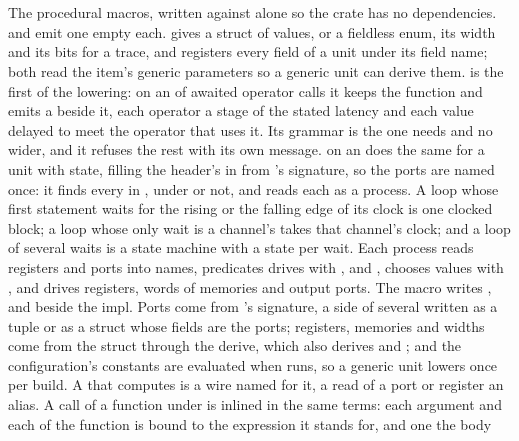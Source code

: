 \section{}
\label{sec:r-macros}

The procedural macros, written against  alone so the
crate has no dependencies.  and
 emit one empty  each.
 gives a struct of values, or a fieldless
enum, its width and its bits for a trace, and 
registers every field of a unit under its field name; both read the
item's generic parameters so a generic unit can derive them.
\code{\#[pipeline(op = latency, ..)]} is the first of the lowering: on
an  of awaited operator calls it keeps the function and
emits a  beside it, each operator a stage of the
stated latency and each value delayed to meet the operator that uses
it. Its grammar is the one  needs and no wider, and it
refuses the rest with its own message. \code{\#[lower]} on an
 does the same for a unit with state,
filling the header's  in from 's signature,
so the ports are named once: it finds every  in
, under  or not, and reads each as a process.
A loop whose first statement waits for the rising or the falling edge
of its clock is one clocked block; a loop whose only wait is a
channel's takes that channel's clock; and a loop of several waits is
a state machine with a state per wait. Each process reads registers
and ports into names, predicates drives with ,
 and , chooses values with , and
drives registers, words of memories and output ports. The macro
writes ,  and 
beside the impl. Ports come from 's signature, a side of several
written as a tuple or as a struct whose fields are the ports;
registers, memories and widths come from the
struct through the  derive, which also derives
 and ; and the configuration's constants are
evaluated when  runs, so a generic unit lowers once per
build. A  that computes is a wire named for it, a read of a
port or register an alias. A call of a function under \code{\#[lower]}
is inlined in the same terms: each argument and each  of the
function is bound to the expression it stands for, and one the body
